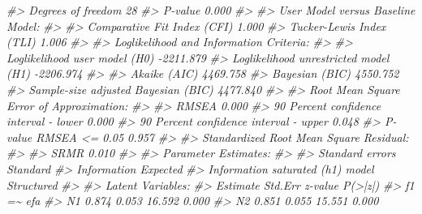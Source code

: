 \documentclass[
  11pt,
]{krantz}
\makeatletter
\newenvironment{Shaded}{\begin{snugshade}}{\end{snugshade}}
\newcommand{\CommentTok}[1]{\textcolor[rgb]{0.37,0.37,0.37}{\textit{#1}}}
\newenvironment{kframe}{%
\medskip{}
\setlength{\fboxsep}{.8em}
 \def\at@end@of@kframe{}%
 \ifinner\ifhmode%
  \def\at@end@of@kframe{\end{minipage}}%
  \begin{minipage}{\columnwidth}%
 \fi\fi%
 \def\FrameCommand##1{\hskip\@totalleftmargin \hskip-\fboxsep
 \colorbox{shadecolor}{##1}\hskip-\fboxsep
     \hskip-\linewidth \hskip-\@totalleftmargin \hskip\columnwidth}%
 \MakeFramed {\advance\hsize-\width
   \@totalleftmargin\z@ \linewidth\hsize
   \@setminipage}}%
 {\par\unskip\endMakeFramed%
 \at@end@of@kframe}
\renewenvironment{Shaded}{\begin{kframe}}{\end{kframe}}
\theoremstyle{definition}
\theoremstyle{definition}
\theoremstyle{definition}
\theoremstyle{definition}
\theoremstyle{remark}
\makeatother
\begin{document}
\begin{Shaded}
\begin{Highlighting}[]
\CommentTok{\#\textgreater{}   Degrees of freedom                                28}
\CommentTok{\#\textgreater{}   P{-}value                                        0.000}
\CommentTok{\#\textgreater{} }
\CommentTok{\#\textgreater{} User Model versus Baseline Model:}
\CommentTok{\#\textgreater{} }
\CommentTok{\#\textgreater{}   Comparative Fit Index (CFI)                    1.000}
\CommentTok{\#\textgreater{}   Tucker{-}Lewis Index (TLI)                       1.006}
\CommentTok{\#\textgreater{} }
\CommentTok{\#\textgreater{} Loglikelihood and Information Criteria:}
\CommentTok{\#\textgreater{} }
\CommentTok{\#\textgreater{}   Loglikelihood user model (H0)              {-}2211.879}
\CommentTok{\#\textgreater{}   Loglikelihood unrestricted model (H1)      {-}2206.974}
\CommentTok{\#\textgreater{}                                                       }
\CommentTok{\#\textgreater{}   Akaike (AIC)                                4469.758}
\CommentTok{\#\textgreater{}   Bayesian (BIC)                              4550.752}
\CommentTok{\#\textgreater{}   Sample{-}size adjusted Bayesian (BIC)         4477.840}
\CommentTok{\#\textgreater{} }
\CommentTok{\#\textgreater{} Root Mean Square Error of Approximation:}
\CommentTok{\#\textgreater{} }
\CommentTok{\#\textgreater{}   RMSEA                                          0.000}
\CommentTok{\#\textgreater{}   90 Percent confidence interval {-} lower         0.000}
\CommentTok{\#\textgreater{}   90 Percent confidence interval {-} upper         0.048}
\CommentTok{\#\textgreater{}   P{-}value RMSEA \textless{}= 0.05                          0.957}
\CommentTok{\#\textgreater{} }
\CommentTok{\#\textgreater{} Standardized Root Mean Square Residual:}
\CommentTok{\#\textgreater{} }
\CommentTok{\#\textgreater{}   SRMR                                           0.010}
\CommentTok{\#\textgreater{} }
\CommentTok{\#\textgreater{} Parameter Estimates:}
\CommentTok{\#\textgreater{} }
\CommentTok{\#\textgreater{}   Standard errors                             Standard}
\CommentTok{\#\textgreater{}   Information                                 Expected}
\CommentTok{\#\textgreater{}   Information saturated (h1) model          Structured}
\CommentTok{\#\textgreater{} }
\CommentTok{\#\textgreater{} Latent Variables:}
\CommentTok{\#\textgreater{}                    Estimate  Std.Err  z{-}value  P(\textgreater{}|z|)}
\CommentTok{\#\textgreater{}   f1 =\textasciitilde{} efa                                           }
\CommentTok{\#\textgreater{}     N1                0.874    0.053   16.592    0.000}
\CommentTok{\#\textgreater{}     N2                0.851    0.055   15.551    0.000}

\end{Highlighting}
\end{Shaded}
\end{document}

